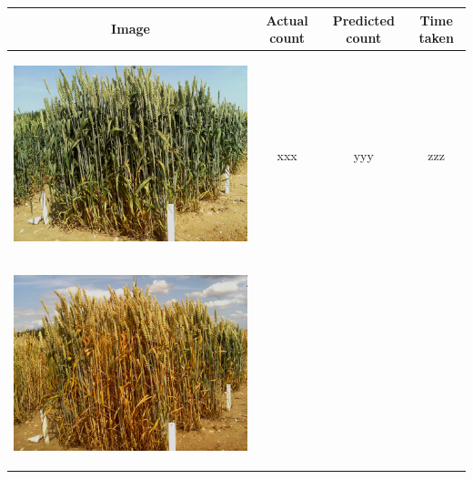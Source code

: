 \begin{table}[h!]
  \centering
  \begin{tabular}{ | c | c | c | c |}
    \hline
    Image & Actual count & Predicted count & Time taken \\ \hline
    \begin{minipage}{.3\textwidth}
      \begin{center}
		\includegraphics[width=\linewidth]{Images/008}
      \end{center}
    \end{minipage}
    &
      xxx
    & 
      yyy
    & 
      zzz
    \\ \hline
    \begin{minipage}{.3\textwidth}
      \begin{center}
		\includegraphics[width=\linewidth]{Images/009}

\end{center}
\end{minipage}
\end{tabular}
\end{table}
